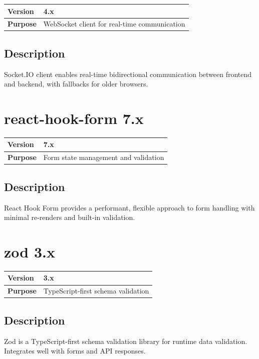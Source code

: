 \documentclass[12pt,a4paper]{report}
\begin{document}
\begin{tabular}{|p{4cm}|p{10cm}|}
\hline
\textbf{Version} & 4.x \\
\hline
\textbf{Purpose} & WebSocket client for real-time communication \\
\hline
\end{tabular}

\subsection{Description}

Socket.IO client enables real-time bidirectional communication between frontend and backend, with fallbacks for older browsers.

\section{react-hook-form 7.x}

\begin{tabular}{|p{4cm}|p{10cm}|}
\hline
\textbf{Version} & 7.x \\
\hline
\textbf{Purpose} & Form state management and validation \\
\hline
\end{tabular}

\subsection{Description}

React Hook Form provides a performant, flexible approach to form handling with minimal re-renders and built-in validation.

\section{zod 3.x}

\begin{tabular}{|p{4cm}|p{10cm}|}
\hline
\textbf{Version} & 3.x \\
\hline
\textbf{Purpose} & TypeScript-first schema validation \\
\hline
\end{tabular}

\subsection{Description}

Zod is a TypeScript-first schema validation library for runtime data validation. Integrates well with forms and API responses.
\end{document}
